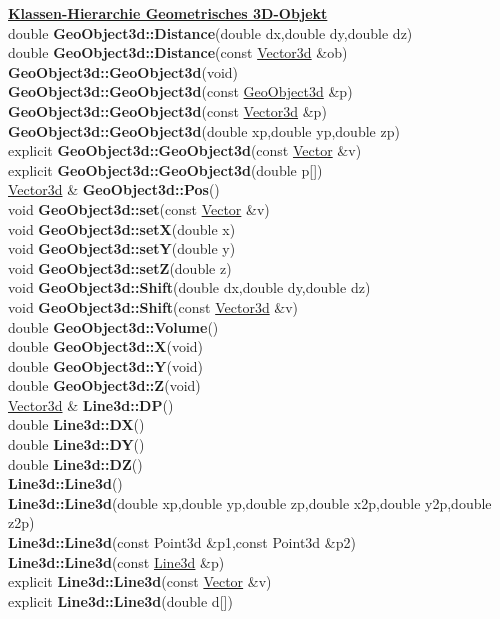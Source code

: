 \documentclass[10pt,titlepage]{article}
\newcommand{\subtitle}[1]{{\noindent\bf#1}}
\def\functionlistentry#1#2#3#4#5#6{\noindent #1 {\bf #2}(#3) \dotfill #6\\}
\begin{document}
{{\subtitle{\hyperlink{SECTION:geoObject3d}{Klassen-Hierarchie Geometrisches 3D-Objekt}}\\
\functionlistentry{double}{GeoObject3d::Distance}{double dx,double dy,double dz}{646}{geoObject3d}{}
\functionlistentry{double}{GeoObject3d::Distance}{const \hyperlink{Vector3d}{Vector3d} \&ob}{647}{geoObject3d}{}
\functionlistentry{}{GeoObject3d::GeoObject3d}{void}{630}{geoObject3d}{}
\functionlistentry{}{GeoObject3d::GeoObject3d}{const \hyperlink{GeoObject3d}{GeoObject3d} \&p}{631}{geoObject3d}{}
\functionlistentry{}{GeoObject3d::GeoObject3d}{const \hyperlink{Vector3d}{Vector3d} \&p}{632}{geoObject3d}{}
\functionlistentry{}{GeoObject3d::GeoObject3d}{double xp,double yp,double zp}{633}{geoObject3d}{}
\functionlistentry{explicit}{GeoObject3d::GeoObject3d}{const \hyperlink{Vector}{Vector} \&v}{634}{geoObject3d}{}
\functionlistentry{explicit}{GeoObject3d::GeoObject3d}{double p[]}{635}{geoObject3d}{}
\functionlistentry{\hyperlink{Vector3d}{Vector3d} \&}{GeoObject3d::Pos}{}{643}{geoObject3d}{}
\functionlistentry{void}{GeoObject3d::set}{const \hyperlink{Vector}{Vector} \&v}{642}{geoObject3d}{}
\functionlistentry{void}{GeoObject3d::setX}{double x}{639}{geoObject3d}{}
\functionlistentry{void}{GeoObject3d::setY}{double y}{640}{geoObject3d}{}
\functionlistentry{void}{GeoObject3d::setZ}{double z}{641}{geoObject3d}{}
\functionlistentry{void}{GeoObject3d::Shift}{double dx,double dy,double dz}{644}{geoObject3d}{}
\functionlistentry{void}{GeoObject3d::Shift}{const \hyperlink{Vector3d}{Vector3d} \&v}{645}{geoObject3d}{}
\functionlistentry{double}{GeoObject3d::Volume}{}{648}{geoObject3d}{}
\functionlistentry{double}{GeoObject3d::X}{void}{636}{geoObject3d}{}
\functionlistentry{double}{GeoObject3d::Y}{void}{637}{geoObject3d}{}
\functionlistentry{double}{GeoObject3d::Z}{void}{638}{geoObject3d}{}
\functionlistentry{\hyperlink{Vector3d}{Vector3d} \&}{Line3d::DP}{}{676}{geoObject3d}{}
\functionlistentry{double}{Line3d::DX}{}{673}{geoObject3d}{}
\functionlistentry{double}{Line3d::DY}{}{674}{geoObject3d}{}
\functionlistentry{double}{Line3d::DZ}{}{675}{geoObject3d}{}
\functionlistentry{}{Line3d::Line3d}{}{659}{geoObject3d}{}
\functionlistentry{}{Line3d::Line3d}{double xp,double yp,double zp,double x2p,double y2p,double z2p}{660}{geoObject3d}{}
\functionlistentry{}{Line3d::Line3d}{const Point3d \&p1,const Point3d \&p2}{661}{geoObject3d}{}
\functionlistentry{}{Line3d::Line3d}{const \hyperlink{Line3d}{Line3d} \&p}{662}{geoObject3d}{}
\functionlistentry{explicit}{Line3d::Line3d}{const \hyperlink{Vector}{Vector} \&v}{663}{geoObject3d}{}
\functionlistentry{explicit}{Line3d::Line3d}{double d[]}{664}{geoObject3d}{}
}}
\end{document}
